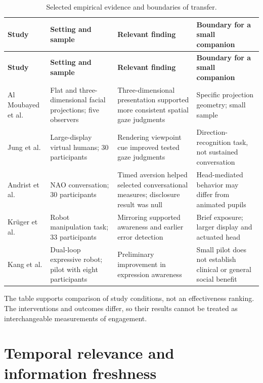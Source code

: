 \documentclass[11pt,a4paper]{article}
\begin{document}
{\small
\begin{longtable}{@{}>{\raggedright\arraybackslash}p{}>{\raggedright\arraybackslash}p{}>{\raggedright\arraybackslash}p{}>{\raggedright\arraybackslash}p{}@{}}
\caption{Selected empirical evidence and boundaries of transfer.}\\
\toprule
\textbf{Study} & \textbf{Setting and sample} & \textbf{Relevant finding} & \textbf{Boundary for a small companion} \\
\midrule
\endfirsthead
\toprule
\textbf{Study} & \textbf{Setting and sample} & \textbf{Relevant finding} & \textbf{Boundary for a small companion} \\
\midrule
\endhead
\bottomrule
\endfoot
Al Moubayed et al. \cite{r6} & Flat and three-dimensional facial projections; five observers & Three-dimensional presentation supported more consistent spatial gaze judgments & Specific projection geometry; small sample \\[0.45em]
Jung et al. \cite{r7} & Large-display virtual humans; 30 participants & Rendering viewpoint cue improved tested gaze judgments & Direction-recognition task, not sustained conversation \\[0.45em]
Andrist et al. \cite{r9} & NAO conversation; 30 participants & Timed aversion helped selected conversational measures; disclosure result was null & Head-mediated behavior may differ from animated pupils \\[0.45em]
Krüger et al. \cite{r8} & Robot manipulation task; 33 participants & Mirroring supported awareness and earlier error detection & Brief exposure; larger display and actuated head \\[0.45em]
Kang et al. \cite{r11} & Dual-loop expressive robot; pilot with eight participants & Preliminary improvement in expression awareness & Small pilot does not establish clinical or general social benefit \\[0.45em]
\end{longtable}
}

The table supports comparison of study conditions, not an effectiveness ranking. The interventions and outcomes differ, so their results cannot be treated as interchangeable measurements of engagement.

\section{Temporal relevance and information freshness}
\end{document}
